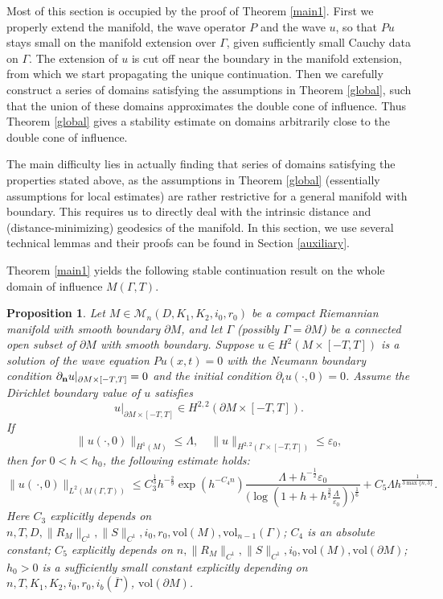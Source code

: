 \documentclass[11pt,letterpaper]{amsart}
\numberwithin{equation}{section}
\theoremstyle{definition}
\theoremstyle{plain}
\theoremstyle{definition}
\theoremstyle{plain}
\newtheorem{wholedomain}[main1]{Proposition}
\theoremstyle{definition}
\theoremstyle{plain}
\newcommand{\vol}{\textrm{vol}}
\begin{document}
Most of this section is occupied by the proof of Theorem \ref{main1}. First we properly extend the manifold, the wave operator $P$ and the wave $u$, so that $Pu$ stays small on the manifold extension over $\Gamma$, given sufficiently small Cauchy data on $\Gamma$. The extension of $u$ is cut off near the boundary in the manifold extension, from which we start propagating the unique continuation. Then we carefully construct a series of domains satisfying the assumptions in Theorem \ref{global}, such that the union of these domains approximates the double cone of influence. Thus Theorem \ref{global} gives a stability estimate on domains arbitrarily close to the double cone of influence. 

The main difficulty lies in actually finding that series of domains satisfying the properties stated above, as the assumptions in Theorem \ref{global} (essentially assumptions for local estimates) are rather restrictive for a general manifold with boundary. This requires us to directly deal with the intrinsic distance and (distance-minimizing) geodesics of the manifold. In this section, we use several technical lemmas and their proofs can be found in Section \ref{auxiliary}.

\smallskip
Theorem \ref{main1} yields the following stable continuation result on the whole domain of influence $M(\Gamma,T)$.

\begin{wholedomain}\label{wholedomain}
Let $M\in \mathcal{M}_n(D,K_1,K_2,i_0,r_0)$ be a compact Riemannian manifold with smooth boundary $\partial M$, and let $\Gamma$ (possibly $\Gamma=\partial M$) be a connected open subset of $\partial M$ with smooth boundary. Suppose $u\in H^2(M\times[-T,T])$ is a solution of the wave equation $Pu(x,t)=0$ with the Neumann boundary condition $\partial_{\bf n}u|_{\partial M \times [-T,T]}=0$ and the initial condition $\partial_t u(\cdot,0)=0$. Assume the Dirichlet boundary value of $u$ satisfies
$$u|_{\partial M\times [-T,T]}\in H^{2,2}(\partial M \times [-T,T]).$$
If  %
$$\|u(\cdot,0)\|_{H^1(M)}\leqslant \Lambda,\quad \|u\|_{H^{2,2}(\Gamma\times [-T,T])}\leqslant \varepsilon_0,$$
then for $0<h<h_0$, the following estimate holds:
$$\|u(\,\cdotp,0)\|_{L^2(M(\Gamma,T))} \leqslant C_3^{\frac{1}{3}}h^{-\frac{2}{9}}\exp(h^{-C_4 n}) \frac{\Lambda+h^{-\frac{1}{2}}\varepsilon_0}{\big(\log (1+h+h^{\frac{3}{2}}\frac{\Lambda}{\varepsilon_0})\big) ^{\frac{1}{6}}}+C_5\Lambda h^{\frac{1}{3\max{\{n,3\}}}}.$$
Here $C_3$ explicitly depends on $n,T,D,\|R_M\|_{C^1},\|S\|_{C^1},i_0,r_0,\vol(M),\vol_{n-1}(\Gamma)$; $C_4$ is an absolute constant; $C_5$ explicitly depends on $n,\|R_M\|_{C^1},\|S\|_{C^1},i_0, \vol(M), \vol(\partial M)$; $h_0>0$ is a sufficiently small constant explicitly depending on $n,T,K_1,K_2,i_0,r_0,i_b(\overline{\Gamma})$, $\vol(\partial M)$.
\end{wholedomain}
\end{document}
